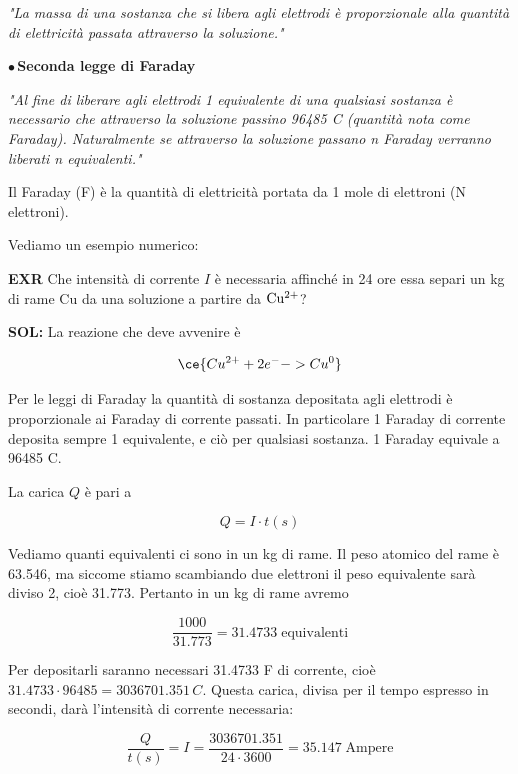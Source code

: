 \vspace{0.2cm}\textit{"La massa di una sostanza che si libera agli elettrodi è proporzionale alla quantità di elettricità passata attraverso la soluzione."}

\vspace{0.2cm}$\bullet$\,\textbf{Seconda legge di Faraday}

\vspace{0.2cm}\textit{"Al fine di liberare agli elettrodi 1 equivalente di una qualsiasi sostanza è necessario che attraverso la soluzione passino 96485 C (quantità nota come Faraday). Naturalmente se attraverso la soluzione passano n Faraday verranno liberati n equivalenti."}

\vspace{0.2cm}Il Faraday (F) è la quantità di elettricità portata da 1 mole di elettroni (N elettroni).

Vediamo un esempio numerico:

\vspace{0.2cm}\textbf{EXR} Che intensità di corrente $I$ è necessaria affinché in 24 ore essa separi un kg di rame Cu da una soluzione a partire da $\rm Cu^{2+}$?

\vspace{0.2cm}\textbf{SOL:} La reazione che deve avvenire è

$$\ce{Cu^{2+} + 2e^- -> Cu^0}$$

Per le leggi di Faraday la quantità di sostanza depositata agli elettrodi è proporzionale ai Faraday di corrente passati. In particolare 1 Faraday di corrente deposita sempre 1 equivalente, e ciò per qualsiasi sostanza. 1 Faraday equivale a 96485 C.

La carica $Q$ è pari a

$$Q=I \cdot t(s)$$

Vediamo quanti equivalenti ci sono in un kg di rame. Il peso atomico del rame è 63.546, ma siccome stiamo scambiando due elettroni il peso equivalente sarà diviso 2, cioè 31.773. Pertanto in un kg di rame avremo

$$\frac{1000}{31.773} = 31.4733 \; \text{equivalenti}$$

Per depositarli saranno necessari 31.4733 F di corrente, cioè $31.4733 \cdot 96485 = 3036701.351 \, C$. Questa carica, divisa per il tempo espresso in secondi, darà l'intensità di corrente necessaria:

$$\frac{Q}{t(s)} = I = \frac{3036701.351}{24 \cdot 3600} = 35.147 \; \text{Ampere}$$